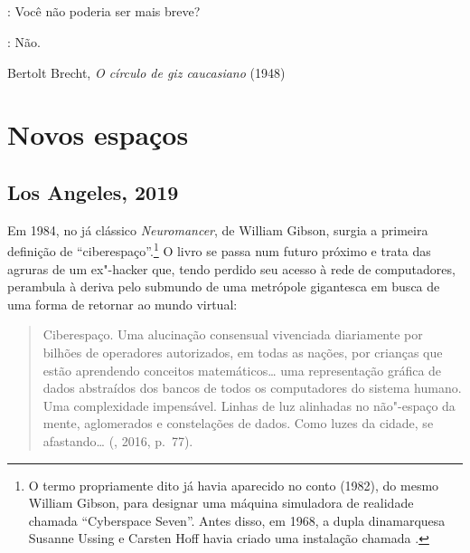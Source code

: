 \chapter*{}
\thispagestyle{empty}
\begin{vplace}[30]
: Você não poderia ser mais breve?

\noindent{}: Não.

Bertolt Brecht, \emph{O círculo de giz caucasiano} (1948)
\end{vplace}

\part{Novos espaços}

\chapter{Los Angeles, 2019}

Em 1984, no já clássico \emph{Neuromancer}, de William Gibson, surgia a
primeira definição de ``ciberespaço''.\footnote{O termo propriamente
  dito já havia aparecido no conto {} (1982), do
  mesmo William Gibson, para designar uma máquina simuladora de
  realidade chamada ``Cyberspace Seven''. Antes disso, em 1968, a dupla
  dinamarquesa Susanne Ussing e Carsten Hoff havia criado uma
  instalação chamada {}.} O livro se passa num
futuro próximo e trata das agruras de um ex"-hacker que, tendo perdido
seu acesso à rede de computadores, perambula à deriva pelo submundo de
uma metrópole gigantesca em busca de uma forma de retornar ao mundo
virtual:

\begin{quote}
Ciberespaço. Uma alucinação consensual vivenciada diariamente por
bilhões de operadores autorizados, em todas as nações, por crianças que
estão aprendendo conceitos matemáticos\ldots{} uma representação gráfica de
dados abstraídos dos bancos de todos os computadores do sistema humano.
Uma complexidade impensável. Linhas de luz alinhadas no não"-espaço da
mente, aglomerados e constelações de dados. Como luzes da cidade, se
afastando\ldots{} (, 2016, p.~77).
\end{quote}

